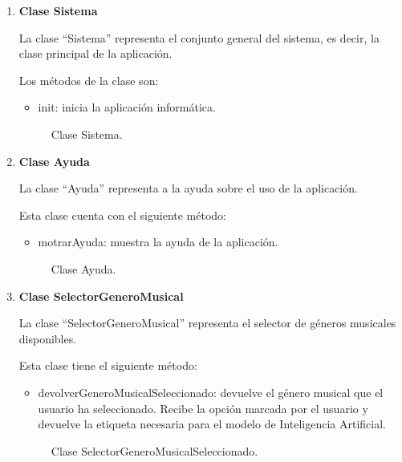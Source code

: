 \begin{enumerate}
  \item \textbf{Clase Sistema}

  La clase ``Sistema'' representa el conjunto general del sistema, es decir, la clase principal de la aplicación.

  Los métodos de la clase son:

  \begin{itemize}
      \item init: inicia la aplicación informática.
  \end{itemize}

  \begin{figure}[H]
    \centering
    
    \caption{Clase Sistema.}
  \end{figure}


  \item \textbf{Clase Ayuda}

  La clase ``Ayuda'' representa a la ayuda sobre el uso de la aplicación.

  Esta clase cuenta con el siguiente método:

  \begin{itemize}
      \item motrarAyuda: muestra la ayuda de la aplicación.
  \end{itemize}

  \begin{figure}[H]
    \centering
    
    \caption{Clase Ayuda.}
  \end{figure}

  \item \textbf{Clase SelectorGeneroMusical}

  La clase ``SelectorGeneroMusical'' representa el selector de géneros musicales disponibles.

  Esta clase tiene el siguiente método:

  \begin{itemize}
      \item devolverGeneroMusicalSeleccionado: devuelve el género musical que el usuario ha seleccionado. Recibe la opción marcada por el usuario y devuelve la etiqueta necesaria para el modelo de Inteligencia Artificial.
  \end{itemize}

  \begin{figure}[H]
    \centering
    
    \caption{Clase SelectorGeneroMusicalSeleccionado.}
  \end{figure}



\end{enumerate}
